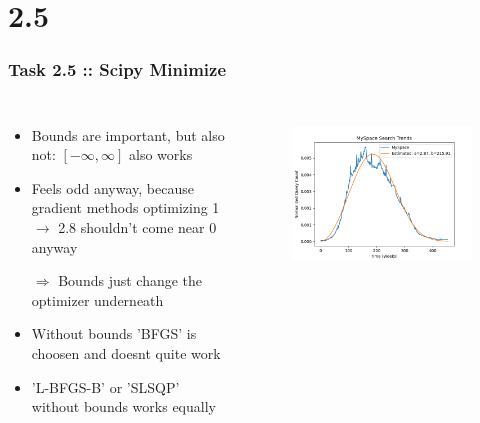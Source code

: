 \documentclass[10pt,aspectratio=169,handout]{beamer}
\begin{document}
\section{2.5}
\begin{frame}
    \frametitle{Task 2.5 :: Scipy Minimize}
    \inputminted[bgcolor=LightGray,fontsize=\small]{python}{code/minimize-kl.py}

    \begin{columns}
    \begin{column}{0.7\textwidth}
        \begin{itemize}
            \item Bounds are important, but also not: $[-\infty, \infty]$ also works
            \item Feels odd anyway, because gradient methods optimizing 1 $\rightarrow$ 2.8 shouldn't come near 0 anyway
            \item[$\Rightarrow$] Bounds just change the optimizer underneath
            \item Without bounds 'BFGS' is choosen and doesnt quite work
            \item 'L-BFGS-B' or 'SLSQP' without bounds works equally
        \end{itemize}
    \end{column}

    \begin{column}{0.3\textwidth}
        \begin{figure}
            \includegraphics[width=\textwidth]{images/sciminimize.png}
        \end{figure}
    \end{column}
    \end{columns}

\end{frame}
\end{document}
